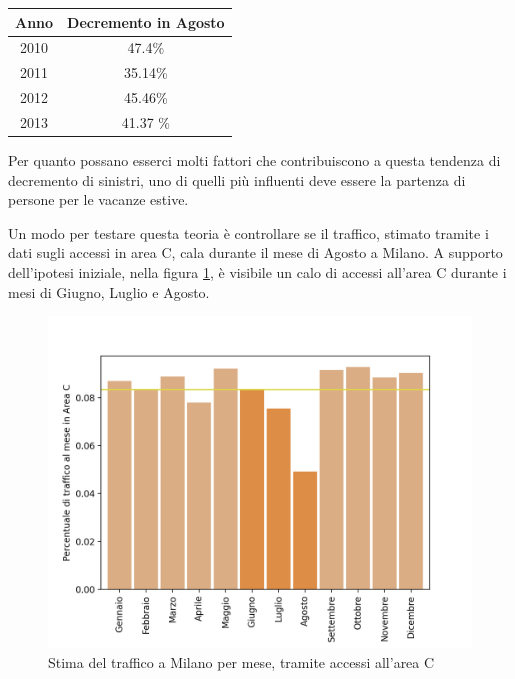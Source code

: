 \documentclass[a4paper,12pt]{report}
\begin{document}
\begin{center}
    \def\arraystretch{1.5}%
    \begin{tabular}{ |c|c| } 
        \hline
        Anno & Decremento in Agosto \\ 
        \hline
        2010 & 47.4\%  \\ 
        \rowcolor{TableGray}
        2011 & 35.14\% \\
        2012 & 45.46\% \\
        \rowcolor{TableGray}
        2013 & 41.37 \% \\
        \hline
    \end{tabular}
\end{center}

Per quanto possano esserci molti fattori che contribuiscono a questa tendenza di 
decremento di sinistri, uno di quelli più influenti deve essere la partenza 
di persone per le vacanze estive.

Un modo per testare questa teoria è controllare se il traffico, 
stimato tramite i dati sugli accessi in area C, cala durante il mese di 
Agosto a Milano. 
A supporto dell'ipotesi iniziale, nella figura \ref{fig:stima-traffico-mensile}, 
è visibile un calo di accessi all'area C durante i mesi di Giugno, Luglio e Agosto.

\begin{figure}
    \includegraphics[width=\linewidth]{../src/area_c/stima_traffico_mese.png}
    \caption{Stima del traffico a Milano per mese, tramite accessi all'area C}
    \label{fig:stima-traffico-mensile}
\end{figure}
\end{document}
